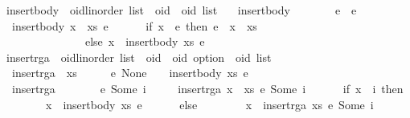 \begin{isabelle}
\isamarkupfalse%
\ insert{\isacharunderscore}body\ {\isacharcolon}{\isacharcolon}\ {\isachardoublequoteopen}{\isacharprime}oid{\isacharcolon}{\isacharcolon}{\isacharbraceleft}linorder{\isacharbraceright}\ list\ {\isasymRightarrow}\ {\isacharprime}oid\ {\isasymRightarrow}\ {\isacharprime}oid\ list{\isachardoublequoteclose}\ \isanewline
\ \ {\isachardoublequoteopen}insert{\isacharunderscore}body\ {\isacharbrackleft}{\isacharbrackright}\ \ \ \ \ \ \ e\ {\isacharequal}\ {\isacharbrackleft}e{\isacharbrackright}{\isachardoublequoteclose}\ {\isacharbar}\isanewline
\ \ {\isachardoublequoteopen}insert{\isacharunderscore}body\ {\isacharparenleft}x\ {\isacharhash}\ xs{\isacharparenright}\ e\ {\isacharequal}\isanewline
\ \ \ \ \ {\isacharparenleft}if\ x\ {\isacharless}\ e\ then\ e\ {\isacharhash}\ x\ {\isacharhash}\ xs\isanewline
\ \ \ \ \ \ \ \ \ \ \ \ \ \ \ else\ x\ {\isacharhash}\ insert{\isacharunderscore}body\ xs\ e{\isacharparenright}{\isachardoublequoteclose}\isanewline
\isanewline
{}\isamarkupfalse%
\ insert{\isacharunderscore}rga\ {\isacharcolon}{\isacharcolon}\ {\isachardoublequoteopen}{\isacharprime}oid{\isacharcolon}{\isacharcolon}{\isacharbraceleft}linorder{\isacharbraceright}\ list\ {\isasymRightarrow}\ {\isacharparenleft}{\isacharprime}oid\ {\isasymtimes}\ {\isacharprime}oid\ option{\isacharparenright}\ {\isasymRightarrow}\ {\isacharprime}oid\ list{\isachardoublequoteclose}\ \isanewline
\ \ {\isachardoublequoteopen}insert{\isacharunderscore}rga\ \ xs\ \ \ \ \ \ {\isacharparenleft}e{\isacharcomma}\ None{\isacharparenright}\ \ \ {\isacharequal}\ insert{\isacharunderscore}body\ xs\ e{\isachardoublequoteclose}\ {\isacharbar}\isanewline
\ \ {\isachardoublequoteopen}insert{\isacharunderscore}rga\ \ {\isacharbrackleft}{\isacharbrackright}\ \ \ \ \ \ {\isacharparenleft}e{\isacharcomma}\ Some\ i{\isacharparenright}\ {\isacharequal}\ {\isacharbrackleft}{\isacharbrackright}{\isachardoublequoteclose}\ {\isacharbar}\isanewline
\ \ {\isachardoublequoteopen}insert{\isacharunderscore}rga\ {\isacharparenleft}x\ {\isacharhash}\ xs{\isacharparenright}\ {\isacharparenleft}e{\isacharcomma}\ Some\ i{\isacharparenright}\ {\isacharequal}\isanewline
\ \ \ \ \ {\isacharparenleft}if\ x\ {\isacharequal}\ i\ then\isanewline
\ \ \ \ \ \ \ \ x\ {\isacharhash}\ insert{\isacharunderscore}body\ xs\ e\isanewline
\ \ \ \ \ \ else\isanewline
\ \ \ \ \ \ \ \ x\ {\isacharhash}\ insert{\isacharunderscore}rga\ xs\ {\isacharparenleft}e{\isacharcomma}\ Some\ i{\isacharparenright}{\isacharparenright}{\isachardoublequoteclose}\isanewline

\end{isabelle}
